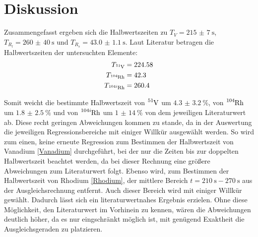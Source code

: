 \section{Diskussion}
\label{sec:Diskussion}

Zusammengefasst ergeben sich die Halbwertszeiten zu $T_V=\SI{215(7)}{\s}$, $T_{R_l}=\SI{260(40)}{\s}$ und $T_{R_s}=\SI{43.0(11)}{\s}$. Laut Literatur \cite{JLab} betragen die Halbwertszeiten der untersuchten Elemente:
\begin{align*}
    T_{\ce{^{51}V}}&=224.58  \\
    T_{\ce{^{104}Rh}}&=42.3  \\
    T_{\ce{^{104i}Rh}}&=260.4
\end{align*}

Somit weicht die bestimmte Halbwertszeit von $\ce{^{51}V}$ um $\SI{4.3(32)}{\percent}$, von $\ce{^{104}Rh}$ um $\SI{1.8(25)}{\percent}$ und von $\ce{^{104i}Rh}$ um $\SI{1(14)}{\percent}$ von dem jeweiligen Literaturwert ab. Diese recht geringen Abweichungen kommen zu stande, da in der Auswertung die jeweiligen Regressionsbereiche mit einiger Willkür ausgewählt werden. So wird zum einen, keine erneute Regression zum Bestimmen der Halbwertszeit von Vanadium \ref{Vanadium} durchgeführt, bei der nur die Zeiten bis zur doppelten Halbwertszeit beachtet werden, da bei dieser Rechnung eine größere Abweichungen zum Literaturwert folgt. Ebenso wird, zum Bestimmen der Halbwertszeit von Rhodium \ref{Rhodium}, der mittlere Bereich $t=\SI{210}{\s}-\SI{270}{\s}$ aus der Ausgleichsrechnung entfernt. Auch dieser Bereich wird mit einiger Willkür gewählt. Dadurch lässt sich ein literaturwertnahes Ergebnis erzielen. Ohne diese Möglichkeit, den Literaturwert im Vorhinein zu kennen, wären die Abweichungen deutlich höher, da es nur eingschränkt möglich ist, mit genügend Exaktheit die Ausgleichsgeraden zu platzieren.  



